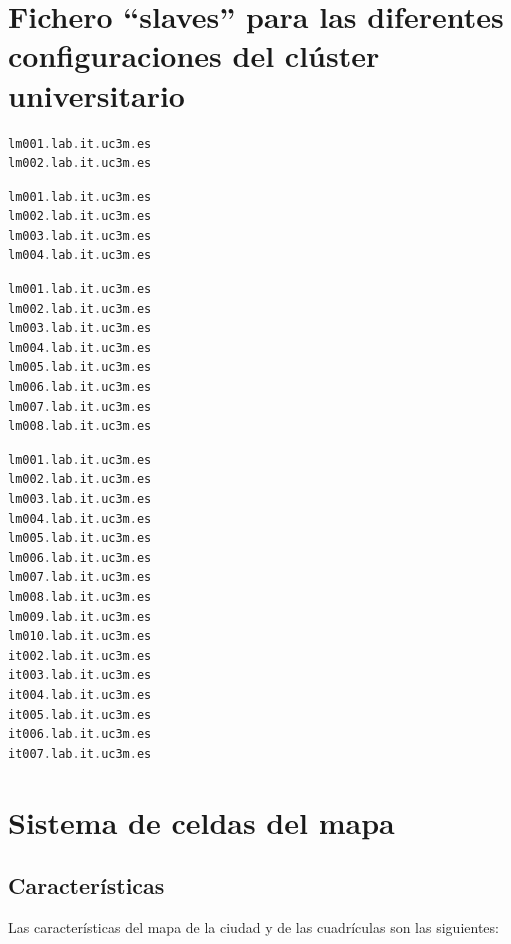 \chapter{Fichero ``slaves'' para las diferentes configuraciones del clúster universitario \label{slavesUni}}
\begin{lstlisting}[label=2nodos,language=C,frame=single,caption=Fichero ``slaves'' para configuración con dos nodos]
lm001.lab.it.uc3m.es
lm002.lab.it.uc3m.es
\end{lstlisting}
\begin{lstlisting}[label=4nodos,language=C,frame=single,caption=Fichero ``slaves'' para configuración con cuatro nodos]
lm001.lab.it.uc3m.es
lm002.lab.it.uc3m.es
lm003.lab.it.uc3m.es
lm004.lab.it.uc3m.es
\end{lstlisting}
\begin{lstlisting}[label=8nodos,language=C,frame=single,caption=Fichero ``slaves'' para configuración con ocho nodos]
lm001.lab.it.uc3m.es
lm002.lab.it.uc3m.es
lm003.lab.it.uc3m.es
lm004.lab.it.uc3m.es
lm005.lab.it.uc3m.es
lm006.lab.it.uc3m.es
lm007.lab.it.uc3m.es
lm008.lab.it.uc3m.es
\end{lstlisting}
\clearpage
\begin{lstlisting}[label=16nodos,language=C,frame=single,caption=Fichero ``slaves'' para configuración con dieciseis nodos]
lm001.lab.it.uc3m.es
lm002.lab.it.uc3m.es
lm003.lab.it.uc3m.es
lm004.lab.it.uc3m.es
lm005.lab.it.uc3m.es
lm006.lab.it.uc3m.es
lm007.lab.it.uc3m.es
lm008.lab.it.uc3m.es
lm009.lab.it.uc3m.es
lm010.lab.it.uc3m.es
it002.lab.it.uc3m.es
it003.lab.it.uc3m.es
it004.lab.it.uc3m.es
it005.lab.it.uc3m.es
it006.lab.it.uc3m.es
it007.lab.it.uc3m.es
\end{lstlisting}


\chapter{Sistema de celdas del mapa \label{cuadricula}}
\section{Características}
Las características del mapa de la ciudad y de las cuadrículas son las siguientes:

